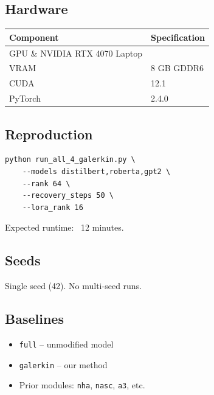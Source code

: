 \subsection{Hardware}

\begin{table}[H]
\centering
\small
\begin{tabular}{ll}
\toprule
\textbf{Component} & \textbf{Specification} \\
\midrule
GPU \& NVIDIA RTX 4070 Laptop \\
VRAM & 8 GB GDDR6 \\
CUDA & 12.1 \\
PyTorch & 2.4.0 \\
\bottomrule
\end{tabular}
\end{table}

\subsection{Reproduction}

\begin{lstlisting}
python run_all_4_galerkin.py \
    --models distilbert,roberta,gpt2 \
    --rank 64 \
    --recovery_steps 50 \
    --lora_rank 16
\end{lstlisting}

Expected runtime: ~12 minutes.

\subsection{Seeds}

Single seed (42). No multi-seed runs.

\subsection{Baselines}

\begin{itemize}
\item \texttt{full} -- unmodified model
\item \texttt{galerkin} -- our method
\item Prior modules: \texttt{nha}, \texttt{nasc}, \texttt{a3}, etc.

\end{itemize}
